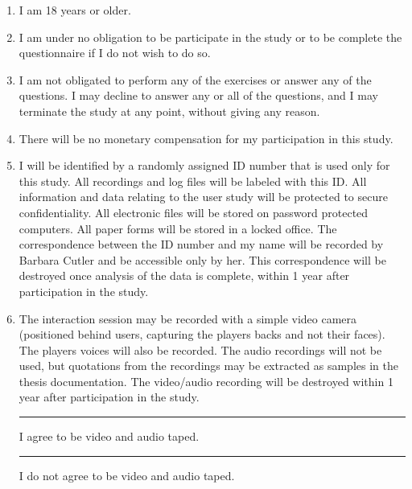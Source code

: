 \documentclass[10pt]{article}
\begin{document}
\begin{enumerate}

\item I am 18 years or older.

\item
I am under no obligation to be participate in the study or to be
  complete the questionnaire if I do not wish to do so.

\item 
I am not obligated to perform any of the exercises or
  answer any of the questions.  I may decline to answer any or all of
  the questions, and I may terminate the study at any point, without
  giving any reason.

\item 
There will be no monetary compensation for my participation in this 
study. 

\item I will be identified by a randomly assigned ID number that is
  used only for this study.  All recordings and log files will be
  labeled with this ID.  All information and data relating to the user
  study will be protected to secure confidentiality.  All electronic
  files will be stored on password protected computers.  All paper
  forms will be stored in a locked office.  The correspondence
  between the ID number and my name will be recorded by Barbara Cutler
  and be accessible only by her.  This correspondence will be
  destroyed once analysis of the data is complete, within 1 year after
  participation in the study.

\item  The interaction session
  may be recorded with a simple video camera (positioned behind users, 
  capturing the players backs and not their faces). 
  The players voices will also be recorded.  The audio
  recordings will not be used, but quotations from the recordings may
  be extracted as samples in the thesis documentation. The video/audio recording
  will be destroyed within 1 year after participation in the study.\\
\noindent
\hspace*{0.3in} \rule{0.3in}{1pt} I agree to be video and audio taped. \\
\hspace*{0.3in} \rule{0.3in}{1pt} I do not agree to be video and audio taped.


\end{enumerate}
\end{document}
